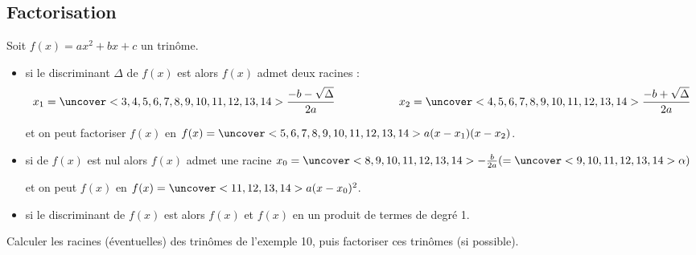 \documentclass{beamer}
\begin{document}
\subsection{Factorisation}

  \begin{frame}
    \begin{theorem}[Central]
    Soit $f(x)=ax^2+bx+c$ un trinôme.
    \begin{itemize}
      \item  si le discriminant $\Delta$ de $f(x)$ est 
       alors $f(x)$ admet deux racines :
      $$x_1=\uncover<3,4,5,6,7,8,9,10,11,12,13,14>{\frac{-b-\sqrt{\Delta}}{2a}} 
      \hspace{2cm} x_2=
      \uncover<4,5,6,7,8,9,10,11,12,13,14>{\frac{-b+\sqrt{\Delta}}{2a}}$$
     
      et on peut factoriser $f(x)$ en $f(x)=
      \uncover<5,6,7,8,9,10,11,12,13,14>{a(x-x_1)(x-x_2)}$.
     
      \item si  de $f(x)$ est nul alors $f(x)$ admet une racine 
     $x_0=\uncover<8,9,10,11,12,13,14>{-\frac{b}{2a}}(=\uncover<9,10,11,12,13,14>{\alpha})$
     
     et on peut  $f(x)$ en $f(x)=
     \uncover<11,12,13,14>{a(x-x_0)^2}$.
     \item si le discriminant de $f(x)$ est  
     alors $f(x)$  et 
      $f(x)$ en un produit de termes de degré 1.
    \end{itemize}    
  \end{theorem}
  \end{frame}


\begin{frame}
  \begin{example}
    Calculer les racines (éventuelles) des trinômes de l'exemple 10, puis factoriser
    ces trinômes (si possible).
   \end{example}
\end{frame}
\end{document}
